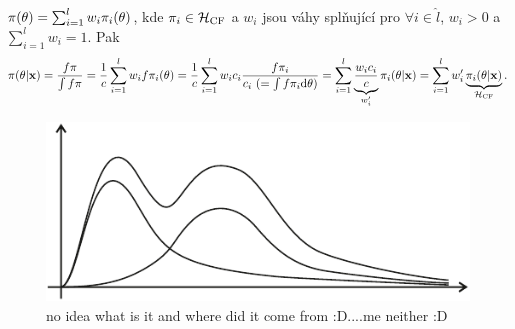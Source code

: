 \begin{remark}[Směs z CF]
	$\pi(\theta)=\sum_{i=1}^lw_i\pi_i(\theta)$, kde $\pi_i\in\mathcal{H}_\mathrm{CF}$ a $w_i$ jsou váhy splňující pro $\forall i\in\hat{l}$, $w_i>0$ a $\sum_{i=1}^l w_i=1$. Pak $$\pi(\theta|\textbf{x})=\frac{f\pi}{\int f\pi}=\frac{1}{c}\sum_{i=1}^lw_i f\pi_i(\theta)=\frac{1}{c}\sum_{i=1}^l w_ic_i\frac{f \pi_i}{c_i~(=\int f\pi_i\mathrm{d}\theta)}=\sum_{i=1}^l \underbrace{\frac{w_ic_i}{c}}_{w_i'}\pi_i(\theta|\textbf{x})=\sum_{i=1}^l w_i'\underbrace{\pi_i(\theta|\textbf{x})}_{\mathcal{H}_\mathrm{CF}}.$$
		\begin{figure}[h]
			\centering
			\includegraphics[width=0.6\linewidth]{pictures/8_1.pdf}
			\caption{no idea what is it and where did it come from :D....me neither :D}
			\label{fig:81}
		\end{figure}
		
\end{remark}

